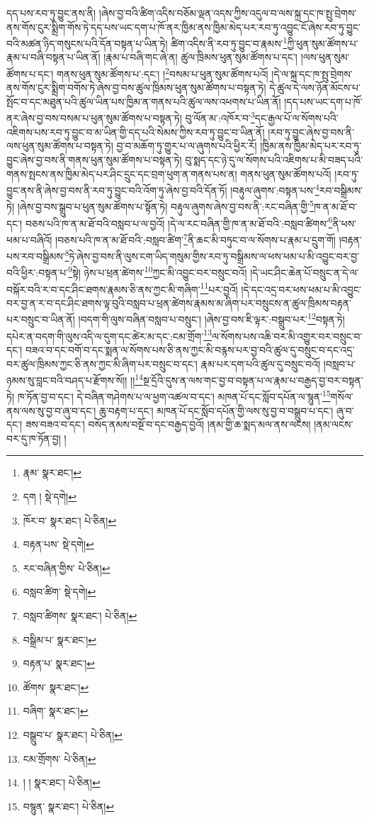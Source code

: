 དད་པས་རབ་ཏུ་བྱུང་ནས་ནི། །ཞེས་བྱ་བའི་ཚིག་འདིས་བཅོམ་ལྡན་འདས་ཀྱིས་འདུལ་བ་ལས་སྐྲ་དང་ཁ་སྤུ་བྲེགས་ནས་གོས་ངུར་སྨྲིག་གོས་ཏེ་དད་པས་ཡང་དག་པ་ཁོ་ནར་ཁྱིམ་ནས་ཁྱིམ་མེད་པར་རབ་ཏུ་འབྱུང་ངོ་ཞེས་རབ་ཏུ་བྱུང་བའི་མཚན་ཉིད་གསུངས་པའི་དོན་བསྟན་པ་ཡིན་ཏེ། ཚིག་འདིས་ནི་རབ་ཏུ་བྱུང་བ་རྣམས་\footnote{རྣམ་  སྣར་ཐང་། }ཀྱི་ཕུན་སུམ་ཚོགས་པ་རྣམ་པ་བཞི་བསྟན་པ་ཡིན་ནོ། །རྣམ་པ་བཞི་གང་ཞེ་ན། ཚུལ་ཁྲིམས་ཕུན་སུམ་ཚོགས་པ་དང་། །ལས་ཕུན་སུམ་ཚོགས་པ་དང་། གནས་ཕུན་སུམ་ཚོགས་པ་:དང་། །\footnote{དག །  སྡེ་དགེ། }བསམ་པ་ཕུན་སུམ་ཚོགས་པའོ། །དེ་ལ་སྐྲ་དང་ཁ་སྤུ་བྲེགས་ནས་གོས་ངུར་སྨྲིག་བགོས་ཏེ་ཞེས་བྱ་བས་ཚུལ་ཁྲིམས་ཕུན་སུམ་ཚོགས་པ་བསྟན་ཏེ། དེ་ཚུལ་དེ་ལས་ཉོན་མོངས་པ་སྤོང་བ་དང་མཐུན་པའི་ཚུལ་ཡིན་པས་ཁྱིམ་ན་གནས་པའི་ཚུལ་ལས་འཕགས་པ་ཡིན་ནོ། །དད་པས་ཡང་དག་པ་ཁོ་ནར་ཞེས་བྱ་བས་བསམ་པ་ཕུན་སུམ་ཚོགས་པ་བསྟན་ཏེ། བུ་ལོན་མ་:འཁོར་བ་\footnote{ཁོར་བ་  སྣར་ཐང་།  པེ་ཅིན། }དང་རྒྱལ་པོ་ལ་སོགས་པའི་འཇིགས་པས་རབ་ཏུ་བྱུང་བ་མ་ཡིན་གྱི་དད་པའི་སེམས་ཀྱིས་རབ་ཏུ་བྱུང་བ་ཡིན་ནོ། །རབ་ཏུ་བྱུང་ཞེས་བྱ་བས་ནི་ལས་ཕུན་སུམ་ཚོགས་པ་བསྟན་ཏེ། བྱ་བ་མཆོག་ཏུ་གྱུར་པ་ལ་ཞུགས་པའི་ཕྱིར་རོ། །ཁྱིམ་ནས་ཁྱིམ་མེད་པར་རབ་ཏུ་བྱུང་ཞེས་བྱ་བས་ནི་གནས་ཕུན་སུམ་ཚོགས་པ་བསྟན་ཏེ། བུ་སྨད་དང་ཉེ་དུ་ལ་སོགས་པའི་འཇིགས་པ་མི་བཟད་པའི་གནས་སྤངས་ནས་ཁྱིམ་མེད་པར་ཤིང་དྲུང་དང་བྲག་ཕུག་ན་གནས་པས་ན། གནས་ཕུན་སུམ་ཚོགས་པའོ། །རབ་ཏུ་བྱུང་ནས་ནི་ཞེས་བྱ་བས་ནི་རབ་ཏུ་བྱུང་བའི་འོག་ཏུ་ཞེས་བྱ་བའི་དོན་ཏོ། །བརྟུལ་ཞུགས་:བསྟན་པས་\footnote{བརྟན་པས་  སྡེ་དགེ། }རབ་བསྒྲིམས་ཏེ། །ཞེས་བྱ་བས་སྒྲུབ་པ་ཕུན་སུམ་ཚོགས་པ་སྟོན་ཏེ། བརྟུལ་ཞུགས་ཞེས་བྱ་བས་ནི་:རང་བཞིན་གྱི་\footnote{རང་བཞིན་གྱིས་  པེ་ཅིན། }ཁ་ན་མ་ཐོ་བ་དང་། བཅས་པའི་ཁ་ན་མ་ཐོ་བའི་བསླབ་པ་ལ་བྱའོ། །དེ་ལ་རང་བཞིན་གྱི་ཁ་ན་མ་ཐོ་བའི་:བསླབ་ཚིགས་\footnote{བསླབ་ཚིག་  སྡེ་དགེ། }ནི་ཕས་ཕམ་པ་བཞིའོ། །བཅས་པའི་ཁ་ན་མ་ཐོ་བའི་:བསླབ་ཚིག་\footnote{བསླབ་ཚིགས་  སྣར་ཐང་།  པེ་ཅིན། }ནི་ཆང་མི་བཏུང་བ་ལ་སོགས་པ་རྣམ་པ་དྲུག་གོ། །བརྟན་པས་རབ་བསྒྲིམས་\footnote{བསྒྲིམ་པ་  སྣར་ཐང་། }ཏེ་ཞེས་བྱ་བས་ནི་ལུས་ངག་ཡིད་གསུམ་གྱིས་རབ་ཏུ་བསྒྲིམས་ལ་ཕས་ཕམ་པ་མི་འབྱུང་བར་བྱ་བའི་ཕྱིར་:བསྟན་པ་\footnote{བརྟན་པ་  སྣར་ཐང་། }སྟེ། ཉེས་པ་ཕྲན་ཚེགས་\footnote{ཚོགས་  སྣར་ཐང་། }ཀྱང་མི་འབྱུང་བར་བསྲུང་བའོ། །དེ་ཡང་ཤིང་ཆེན་པོ་བསྲུང་ན་དེ་ལ་བསྐོར་བའི་ར་བ་དང་ཤིང་ཐགས་རྣམས་ཅི་ནས་ཀྱང་མི་གཞིག་\footnote{བཞིག་  སྣར་ཐང་། }པར་བྱའོ། །དེ་དང་འདྲ་བར་ཕས་ཕམ་པ་མི་འབྱུང་བར་བྱ་ན་ར་བ་དང་ཤིང་ཐགས་ལྟ་བུའི་བསླབ་པ་ཕྲན་ཚེགས་རྣམས་མ་ཞིག་པར་བསྲུངས་ན་ཚུལ་ཁྲིམས་བརྟན་པར་བསྲུང་བ་ཡིན་ནོ། །བདག་གི་ལུས་བཞིན་བསླབ་པ་བསྲུང་། །ཞེས་བྱ་བས་ཇི་ལྟར་:བསྒྲུབ་པར་\footnote{བསྒྲུབ་པ་  སྣར་ཐང་།  པེ་ཅིན། }བསྟན་ཏེ། དཔེར་ན་བདག་གི་ལུས་འདི་ལ་དུག་དང་ཚེར་མ་དང་:ངམ་གྲོག་\footnote{ངམ་གྲོགས་  པེ་ཅིན། }ལ་སོགས་པས་འཆི་བར་མི་འགྱུར་བར་བསྲུང་བ་དང་། བཟའ་བ་དང་བགོ་བ་དང་སྨན་ལ་སོགས་པས་ཅི་ནས་ཀྱང་མི་བརྙས་པར་བྱ་བའི་ཚུལ་དུ་བསྲུང་བ་དང་འདྲ་བར་ཚུལ་ཁྲིམས་ཀྱང་ཅི་ནས་ཀྱང་མི་ཞིག་པར་བསྲུང་བ་དང་། རྣམ་པར་དག་པའི་ཚུལ་དུ་བསྲུང་བའོ། །བསླབ་པ་ཉམས་སུ་བླང་བའི་བཤད་པ་རྫོགས་སོ།། །།\footnote{། །  སྣར་ཐང་།  པེ་ཅིན། }སྔ་དྲོའི་དུས་ན་ལས་གང་བྱ་བ་བསྟན་པ་ལ་རྣམ་པ་བརྒྱད་བྱ་བར་བསྟན་ཏེ། ཁ་ཏོན་བྱ་བ་དང་། དེ་བཞིན་གཤེགས་པ་ལ་ཕྱག་འཚལ་བ་དང་། མཁན་པོ་དང་སློབ་དཔོན་ལ་སྙུན་\footnote{བསྙུན་  སྣར་ཐང་།  པེ་ཅིན། }གསོལ་ནས་ལས་སུ་བྱ་བ་ཞུ་བ་དང་། ཆུ་བརྟག་པ་དང་། མཁན་པོ་དང་སློབ་དཔོན་གྱི་ལས་སུ་བྱ་བ་བསྒྲུབ་པ་དང་། ཞུ་བ་དང་། ཟས་བཟའ་བ་དང་། བསོད་ནམས་བསྔོ་བ་དང་བརྒྱད་བྱའོ། །ནམ་གྱི་ཆ་སྨད་མལ་ནས་ལངས། །ནམ་ལངས་བར་དུ་ཁ་ཏོན་བྱ། །
